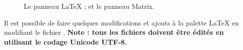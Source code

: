\documentclass[11pt,french]{article}
\begin{document}
\begin{figure}
\centering
{}%
\qquad%
%
\caption[Les panneaux LaTeX et Matrix.]{
 Le panneau LaTeX ; et
 le panneau Matrix.}
\label{fig:LandMPanels}
\end{figure}

Il est possible de faire quelques modifications et ajouts à la palette LaTeX  en modifiant le fichier . \textbf{Note : tous les fichiers  doivent être édités en utilisant le codage Unicode UTF-8.}

\end{document}
